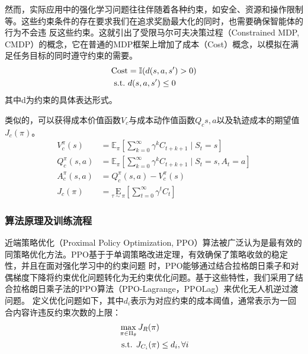 然而，实际应用中的强化学习问题往往伴随着各种约束，如安全、资源和操作限制等。这些约束条件的存在要求我们在追求奖励最大化的同时，也需要确保智能体的行为不会违
反这些约束。这就引出了受限马尔可夫决策过程（Constrained MDP, CMDP）的概念，它在普通的MDP框架上增加了成本（Cost）概念，以模拟在满足任务目标的同时遵守约束的需要。
\begin{align}
    \text{Cost} & = \mathbb I(d(s,a,s')>0)\\
    \text{s.t.} \ &d(s,a,s')\le 0 \notag
\end{align}
其中d为约束的具体表达形式。

类似的，可以获得成本价值函数$V_{c}$与成本动作值函数$Q_{c}{s,a}$以及轨迹成本的期望值$J_{c}(\pi)$。
\begin{align}
    V^{\pi}_{c}\left(s\right) & = \mathbb{E}_{\pi }\left[\sum_{k = 0}^{\infty} \gamma^{k} C_{t+k+1}\mid S_{t}= s\right]\\
    Q^{\pi}_{c}\left(s, a\right) &=\mathbb{E}_{\pi }\left[\sum_{k = 0}^{\infty} \gamma^{k} C_{t+k+1}\mid S_{t}= s,A_{t}=a\right]\\
    A^{\pi}_{c}(s, a)&=Q^{\pi}_{c}\left(s, a\right)-V^{\pi}_{c}\left(s\right)\\
    J_{c}(\pi)&=\underset{\tau \sim \pi }{\mathrm{E}}\left[\sum_{t=0}^{\infty} \gamma^{t} C_{t}\right]
\end{align}
\subsubsection{算法原理及训练流程}
近端策略优化（Proximal Policy Optimization, PPO）\cite{schulman2017proximal}算法被广泛认为是最有效的同策略优化方法。PPO基于于单调策略改进定理，有效确保了策略收敛的稳定性，并且在面对强化学习中的约束问题
时，PPO能够通过结合拉格朗日乘子和对偶梯度下降将约束优化问题转化为无约束优化问题。基于这些特性，我们采用了结合拉格朗日乘子法的PPO算法（PPO-Lagrange，PPOLag）来优化无人机逆过渡问题。
定义优化问题如下，其中$d_{i}$表示为对应约束的成本阈值，通常表示为一回合内容许违反约束次数的上限：
\begin{align}
    &\max _{\pi \in \Pi_{\theta}} J_{R}(\pi) \\
    &\text { s.t. } J_{C_{i}}(\pi) \leq d_{i},\forall i \notag
\end{align}

